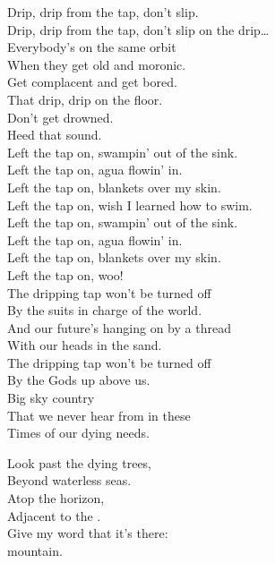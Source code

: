 Drip, drip from the tap, don't slip. \\
Drip, drip from the tap, don't slip on the drip… \\

Everybody's on the same orbit \\
When they get old and moronic. \\
Get complacent and get bored. \\
That drip, drip on the floor. \\
Don't get drowned. \\
Heed that sound. \\

Left the tap on, swampin' out of the sink. \\
Left the tap on, agua flowin' in. \\
Left the tap on, blankets over my skin. \\
Left the tap on, wish I learned how to swim. \\

Left the tap on, swampin' out of the sink. \\
Left the tap on, agua flowin' in. \\
Left the tap on, blankets over my skin. \\
Left the tap on, woo! \\

The dripping tap won't be turned off \\
By the suits in charge of the world. \\
And our future's hanging on by a thread \\
With our heads in the sand. \\

The dripping tap won't be turned off \\
By the Gods up above us. \\
Big sky country \\
That we never hear from in these \\
Times of our dying needs. \\





Look past the dying trees, \\
Beyond waterless seas. \\
Atop the horizon, \\
Adjacent to the . \\
Give my word that it's there: \\
 mountain. \\

